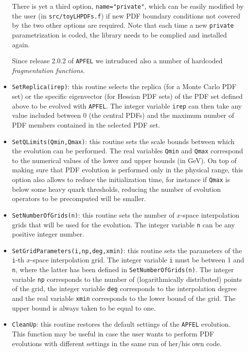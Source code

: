 \documentclass[11pt,a4paper]{article}
\begin{document}
\begin{itemize}
There is yet a third option, {\tt name="private"},  which can be easily modified by the user (in {\tt src/toyLHPDFs.f}) if
new PDF boundary conditions not covered by the two other options
are required.
%
Note that each time a new {\tt private} parametrization is coded,
the library needs to be complied and installed again.

Since release 2.0.2 of {\tt APFEL} we intruduced also a number of
hardcoded \textit{fragmentation functions}.

\item {\tt SetReplica(irep)}: this routine selects the replica (for a
  Monte Carlo PDF set) or the specific eigenvector  (for Hessian PDF
  sets) of the  PDF set defined above to be evolved with {\tt APFEL}.
%
  The integer variable {\tt irep} can then take any value included
  between 0 (the central PDFs)  and the maximum number of PDF members
  contained in the selected PDF set.

\item {\tt SetQLimits(Qmin,Qmax)}: this routine sets the scale
  bounds between which the evolution can be performed. 
%
The real
  variables {\tt Qmin} and {\tt Qmax} correspond to the numerical
  values of the lower and upper bounds (in GeV).
%
 On top of making sure
  that PDF evolution is performed only in the physical range, this
  option also allows to reduce the initialization time, for instance
  if {\tt Qmax} is below some heavy quark thresholds, reducing the number of
  evolution operators to be precomputed will be smaller.

\item {\tt SetNumberOfGrids(n)}: this routine sets the number of
  $x$-space interpolation grids that will be used for the
  evolution. The integer variable {\tt n} can be any positive integer number.

\item {\tt SetGridParameters(i,np,deg,xmin)}: this routine sets the
  parameters of the {\tt i}-th $x$-space interpolation grid. 
%
The
  integer variable {\tt i} must be between 1 and {\tt n}, where
the latter has been defined in
  {\tt SetNumberOfGrids(n)}.
%
 The integer variable {\tt np} corresponds
  to the number of (logarithmically distributed) points of the grid,
  the integer variable {\tt deg} corresponds to the interpolation
  degree and the real variable {\tt xmin} corresponds to the lower
  bound of the grid. The upper bound is always taken to be equal to
  one.

\item{\tt CleanUp}: this routine restores the default settings of the
  {\tt APFEL} evolution. This function may be useful in case the user
  wants to perform PDF evolutions with different settings in the same run
  of her/his own code.


\end{itemize}
\end{document}

